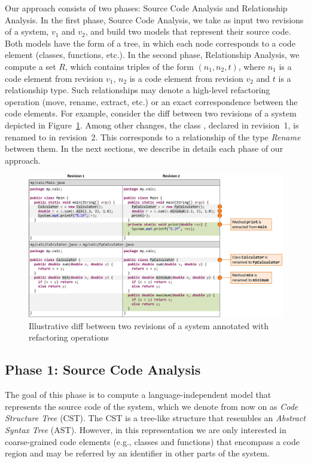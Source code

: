 Our approach consists of two phases: Source Code Analysis and Relationship Analysis.
In the first phase, Source Code Analysis, we take as input two revisions of a system, $v_1$ and $v_2$, and build two models that represent their source code.
Both models have the form of a tree, in which each node corresponds to a code element (classes, functions, etc.).
In the second phase, Relationship Analysis, we compute a set $R$, which contains triples of the form $(n_1, n_2, t)$, where $n_1$ is a code element from revision $v_1$, $n_2$ is a code element from revision $v_2$ and $t$ is a relationship type.
Such relationships may denote a high-level refactoring operation (move, rename, extract, etc.) or an exact correspondence between the code elements.
For example, consider the diff between two revisions of a system depicted in Figure~\ref{FigDiff1}.
Among other changes, the class , declared in revision~1, is renamed to  in revision~2. This corresponds to a relationship of the type \emph{Rename} between them.
In the next sections, we describe in details each phase of our approach.

\begin{figure}[htb]
\centering
\includegraphics[width=1.0\textwidth]{img/diff1.pdf}
\caption{Illustrative diff between two revisions of a system annotated with refactoring operations}
\label{FigDiff1}
\end{figure}


\subsection{Phase 1: Source Code Analysis}

The goal of this phase is to compute a language-independent model that represents the source code of the system, which we denote from now on as \emph{Code Structure Tree} (CST). The CST is a tree-like structure that resembles an \emph{Abstract Syntax Tree} (AST). However, in this representation we are only interested in coarse-grained code elements (e.g., classes and functions) that encompass a code region and may be referred by an identifier in other parts of the system.

